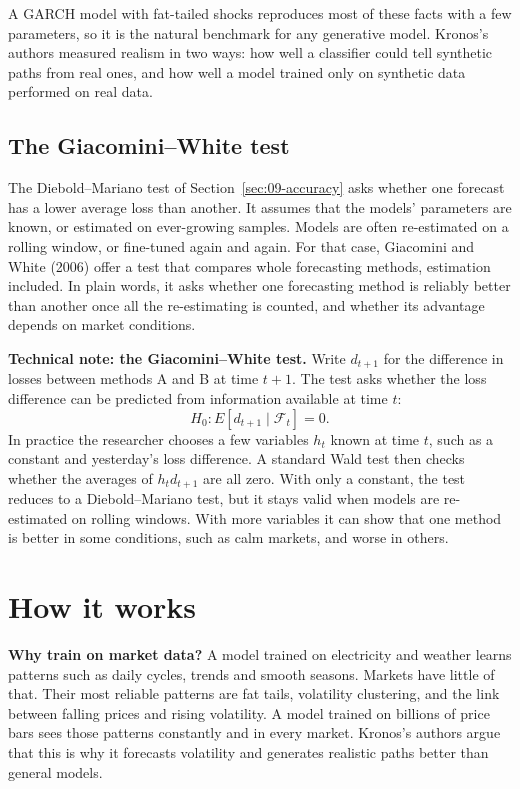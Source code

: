 A GARCH model with fat-tailed shocks reproduces most of these facts with a few parameters, so it is the natural benchmark for any generative model. Kronos's authors measured realism in two ways: how well a classifier could tell synthetic paths from real ones, and how well a model trained only on synthetic data performed on real data.

\subsection{The Giacomini--White test}

The Diebold--Mariano test of Section~\ref{sec:09-accuracy} asks whether one forecast has a lower average loss than another. It assumes that the models' parameters are known, or estimated on ever-growing samples. Models are often re-estimated on a rolling window, or fine-tuned again and again. For that case, Giacomini and White (2006) offer a test that compares whole forecasting methods, estimation included. In plain words, it asks whether one forecasting method is reliably better than another once all the re-estimating is counted, and whether its advantage depends on market conditions.

\begin{technote}
\textbf{Technical note: the Giacomini--White test.} Write $d_{t+1}$ for the difference in losses between methods A and B at time $t+1$. The test asks whether the loss difference can be predicted from information available at time $t$:
\begin{equation}
  H_0: E\left[d_{t+1} \mid \mathcal{F}_t\right] = 0.
  \label{eq:23-gw}
\end{equation}
In practice the researcher chooses a few variables $h_t$ known at time $t$, such as a constant and yesterday's loss difference. A standard Wald test then checks whether the averages of $h_t d_{t+1}$ are all zero. With only a constant, the test reduces to a Diebold--Mariano test, but it stays valid when models are re-estimated on rolling windows. With more variables it can show that one method is better in some conditions, such as calm markets, and worse in others.
\end{technote}

\section{How it works}
\label{sec:23-how}

\textbf{Why train on market data?} A model trained on electricity and weather learns patterns such as daily cycles, trends and smooth seasons. Markets have little of that. Their most reliable patterns are fat tails, volatility clustering, and the link between falling prices and rising volatility. A model trained on billions of price bars sees those patterns constantly and in every market. Kronos's authors argue that this is why it forecasts volatility and generates realistic paths better than general models.

